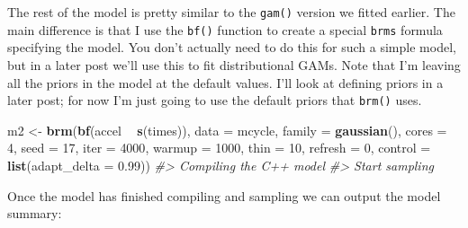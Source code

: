 \documentclass[]{book}
\newenvironment{Shaded}{\begin{snugshade}}{\end{snugshade}}
\newcommand{\CommentTok}[1]{\textcolor[rgb]{0.56,0.35,0.01}{\textit{#1}}}
\newcommand{\DataTypeTok}[1]{\textcolor[rgb]{0.13,0.29,0.53}{#1}}
\newcommand{\DecValTok}[1]{\textcolor[rgb]{0.00,0.00,0.81}{#1}}
\newcommand{\FloatTok}[1]{\textcolor[rgb]{0.00,0.00,0.81}{#1}}
\newcommand{\KeywordTok}[1]{\textcolor[rgb]{0.13,0.29,0.53}{\textbf{#1}}}
\newcommand{\NormalTok}[1]{#1}
\newcommand{\OperatorTok}[1]{\textcolor[rgb]{0.81,0.36,0.00}{\textbf{#1}}}
\newcommand{\StringTok}[1]{\textcolor[rgb]{0.31,0.60,0.02}{#1}}
\begin{document}
The rest of the model is pretty similar to the \texttt{gam()} version we fitted earlier. The main difference is that I use the \texttt{bf()} function to create a special \texttt{brms} formula specifying the model. You don't actually need to do this for such a simple model, but in a later post we'll use this to fit distributional GAMs. Note that I'm leaving all the priors in the model at the default values. I'll look at defining priors in a later post; for now I'm just going to use the default priors that \texttt{brm()} uses.\\

\begin{Shaded}
\begin{Highlighting}[]
\NormalTok{m2 <-}\StringTok{ }\KeywordTok{brm}\NormalTok{(}\KeywordTok{bf}\NormalTok{(accel }\OperatorTok{~}\StringTok{ }\KeywordTok{s}\NormalTok{(times)),}
          \DataTypeTok{data =}\NormalTok{ mcycle, }\DataTypeTok{family =} \KeywordTok{gaussian}\NormalTok{(), }\DataTypeTok{cores =} \DecValTok{4}\NormalTok{, }\DataTypeTok{seed =} \DecValTok{17}\NormalTok{,}
          \DataTypeTok{iter =} \DecValTok{4000}\NormalTok{, }\DataTypeTok{warmup =} \DecValTok{1000}\NormalTok{, }\DataTypeTok{thin =} \DecValTok{10}\NormalTok{, }\DataTypeTok{refresh =} \DecValTok{0}\NormalTok{,}
          \DataTypeTok{control =} \KeywordTok{list}\NormalTok{(}\DataTypeTok{adapt_delta =} \FloatTok{0.99}\NormalTok{))}
\CommentTok{#> Compiling the C++ model}
\CommentTok{#> Start sampling}
\end{Highlighting}
\end{Shaded}

Once the model has finished compiling and sampling we can output the model summary:\\
\end{document}
